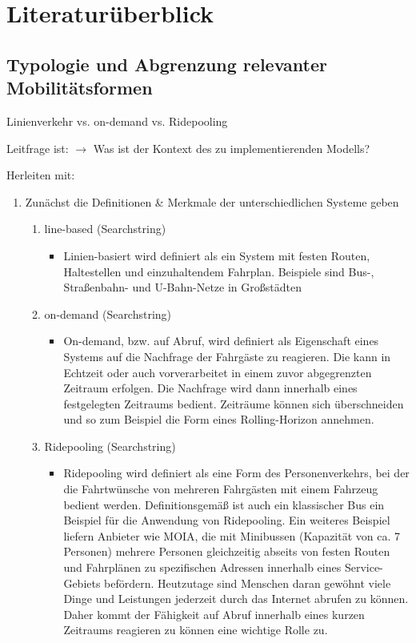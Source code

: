 \chapter{Literaturüberblick}
\section{Typologie und Abgrenzung relevanter Mobilitätsformen}
\label{sec:2.1}
\label{sec:LinienverkehrVsOnDemandVsRidepooling}

Linienverkehr vs. on-demand vs. Ridepooling

Leitfrage ist: $\rightarrow$ Was ist der Kontext des zu implementierenden Modells?

Herleiten mit:
\begin{enumerate}
    \item Zunächst die Definitionen \& Merkmale der unterschiedlichen Systeme geben
    \begin{enumerate}
        \item line-based (Searchstring)
        \begin{itemize}
            \item Linien-basiert  wird definiert als ein System mit festen Routen, Haltestellen und einzuhaltendem Fahrplan. Beispiele sind Bus-, Straßenbahn- und U-Bahn-Netze in Großstädten
        \end{itemize}
        \item on-demand (Searchstring)
        \begin{itemize}
            \item On-demand, bzw. auf Abruf, wird definiert als Eigenschaft eines Systems auf die Nachfrage der Fahrgäste zu reagieren. Die kann in Echtzeit oder auch vorverarbeitet in einem zuvor abgegrenzten Zeitraum erfolgen. Die Nachfrage wird dann innerhalb eines festgelegten Zeitraums bedient. Zeiträume können sich überschneiden und so zum Beispiel die Form eines Rolling-Horizon annehmen.
        \end{itemize}
        \item Ridepooling (Searchstring)
        \begin{itemize}
            \item Ridepooling wird definiert als eine Form des Personenverkehrs, bei der die Fahrtwünsche von mehreren Fahrgästen mit einem Fahrzeug bedient werden. Definitionsgemäß ist auch ein klassischer Bus ein Beispiel für die Anwendung von Ridepooling. Ein weiteres Beispiel liefern Anbieter wie MOIA, die mit Minibussen (Kapazität von ca. 7 Personen) mehrere Personen gleichzeitig abseits von festen Routen und Fahrplänen zu spezifischen Adressen innerhalb eines Service-Gebiets befördern. Heutzutage sind Menschen daran gewöhnt viele Dinge und Leistungen jederzeit durch das Internet abrufen zu können. Daher kommt der Fähigkeit auf Abruf innerhalb eines kurzen Zeitraums reagieren zu können eine wichtige Rolle zu.
        \end{itemize}


\end{enumerate}
\end{enumerate}
